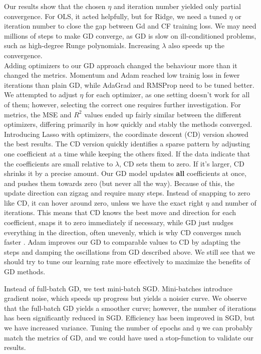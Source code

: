 \documentclass[amssymb,twocolumn,aps,floatfix]{revtex4-2}
\begin{document}
Our results show that the chosen $\eta$ and iteration number yielded only partial convergence. For OLS, it acted helpfully, but for Ridge, we need a tuned $\eta$ or iteration number to close the gap between Gd and CF training loss. We may need millions of steps to make GD converge, as GD is slow on ill-conditioned problems, such as high-degree Runge polynomials. Increasing $\lambda$ also speeds up the convergence. \\

Adding optimizers to our GD approach changed the behaviour more than it changed the metrics. Momentum and Adam reached low trainig loss in fewer iterations than plain GD, while AdaGrad and RMSProp need to be tuned better. We attempted to adjust $\eta$ for each optimizer, as one setting doesn't work for all of them; however, selecting the correct one requires further investigation. For metrics, the MSE and $R^2$ values ended up fairly similar between the different optimizers, differing primarily in how quickly and stably the methods converged. \\

Introducing Lasso with optimizers, the coordinate descent (CD) version showed the best results. The CD version quickly identifies a sparse pattern by adjusting one coefficient at a time while keeping the others fixed. If the data indicate that the coefficients are small relative to $\lambda$, CD sets them to zero. If it's larger, CD shrinks it by a precise amount. Our GD model updates \textbf{all} coefficients at once, and pushes them towards zero (but never all the way). Because of this, the update direction can zigzag and require many steps. Instead of snapping to zero like CD, it can hover around zero, unless we have the exact right $\eta$ and number of iterations. This means that CD knows the best move and direction for each coefficient, snaps it to zero immediately if necessary, while GD just nudges everything in the direction, often unevenly, which is why CD converges much faster \cite{pedregosa2011scikit}. Adam improves our GD to comparable values to CD by adapting the steps and damping the oscillations from GD described above. We still see that we should try to tune our learning rate more effectively to maximize the benefits of GD methods. 

Instead of full-batch GD, we test mini-batch SGD. Mini-batches introduce gradient noise, which speeds up progress but yields a noisier curve. We observe that the full-batch GD yields a smoother curve; however, the number of iterations has been significantly reduced in SGD. Efficiency has been improved in SGD, but we have increased variance. Tuning the number of epochs and $\eta$ we can probably match the metrics of GD, and we could have used a stop-function to validate our results. \\
\end{document}
